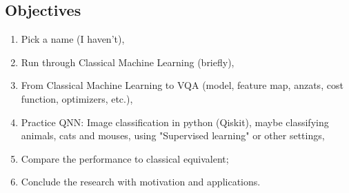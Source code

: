 \subsection{Objectives}
\begin{enumerate}
    \item Pick a name (I haven't),
    \item Run through Classical Machine Learning (briefly),
    \item From Classical Machine Learning to VQA (model, feature map, anzats, cost function, optimizers, etc.),
    \item Practice QNN: Image classification in python (Qiskit), maybe classifying animals, cats and mouses, using "Supervised learning" or other settings,
    \item Compare the performance to classical equivalent;
    \item Conclude the research with motivation and applications.
\end{enumerate}

